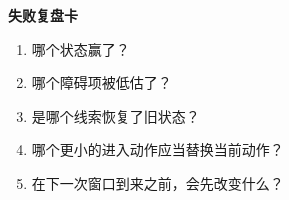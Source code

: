 \begin{templatebox}
\textbf{失败复盘卡}
\begin{enumerate}[nosep]
  \item 哪个状态赢了？
  \item 哪个障碍项被低估了？
  \item 是哪个线索恢复了旧状态？
  \item 哪个更小的进入动作应当替换当前动作？
  \item 在下一次窗口到来之前，会先改变什么？
\end{enumerate}
\end{templatebox}